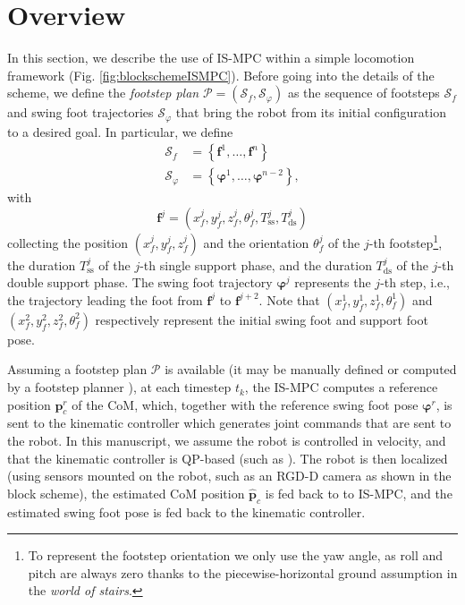 \section{Overview}
In this section, we describe the use of IS-MPC within a simple locomotion
framework (Fig. \ref{fig:blockschemeISMPC}). Before going into the details of the
scheme, we define the \textit{footstep plan}
$\mathcal{P} = (\mathcal{S}_f, \mathcal{S}_{\varphi})$ as the sequence of footsteps
$\mathcal{S}_f$ and swing foot trajectories $\mathcal{S}_{\varphi}$ that bring the
robot from its initial configuration to a desired goal. In particular, we define
\begin{align*}
    \mathcal{S}_f &= \left\{ \bm{f}^1, \dots, \bm{f}^n \right\} \\
    \mathcal{S}_{\varphi} &= \left\{ \bm{\varphi}^1, \dots, \bm{\varphi}^{n-2} \right\},
\end{align*}
with
\begin{equation*}
    \bm{f}^j = \left( x_f^j, y_f^j, z_f^j, \theta_f^j, T_{\mathrm{ss}}^j, T_{\mathrm{ds}}^j \right)
\end{equation*}
collecting the position $(x_f^j, y_f^j, z_f^j)$ and the orientation $\theta_f^j$
of the $j$-th footstep\footnote{To represent the footstep orientation we only
use the yaw angle, as roll and pitch are always zero thanks to the
piecewise-horizontal ground assumption in the \textit{world of stairs}.},
the duration $T_{\mathrm{ss}}^j$ of
the $j$-th single support phase, and the duration $T_{\mathrm{ds}}^j$ of the
$j$-th double support phase. The swing foot trajectory $\bm{\varphi}^j$ represents the 
$j$-th step, i.e., the trajectory leading the foot from $\bm{f}^j$ to $\bm{f}^{j+2}$.
Note that $(x_f^1, y_f^1, z_f^1, \theta_f^1)$
and $(x_f^2, y_f^2, z_f^2, \theta_f^2)$
respectively represent the initial swing foot and support foot pose.

Assuming a footstep plan $\mathcal{P}$ is available (it may be manually defined
or computed by a footstep planner \cite{Cipriano2023RAS}), at each timestep $t_k$,
the IS-MPC computes a reference position $\bm{p}_c^r$ of the CoM, which, together
with the reference swing foot pose $\bm{\varphi}^r$, is sent to the kinematic
controller which generates joint commands that are sent to the robot.
In this manuscript, we assume the robot is controlled in velocity, and that the
kinematic controller is QP-based (such as \cite{Escande2014IJRR}).
The robot is then localized (using sensors mounted on the robot, such as an
RGD-D camera as shown in the block scheme), the estimated CoM position
$\hat{\bm{p}}_c$ is fed back to to IS-MPC, and the estimated swing foot
pose is fed back to the kinematic controller.


